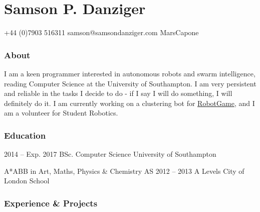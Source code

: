 \documentclass{tccv}
\begin{document}
\part{Samson P. Danziger}

    {+44 (0)7903 516311}
    {samson@samsondanziger.com}
    {MarsCapone}
    
\section{About}
I am a keen programmer interested in autonomous robots and swarm intelligence, reading Computer Science at the University of Southampton. I am very persistent and reliable in the tasks I decide to do - if I say I will do something, I will definitely do it. I am currently working on a clustering bot for \href{https://robotgame.net}{RobotGame}, and I am a volunteer for Student Robotics.

\section{Education}

\begin{yearlist}

\item{2014 -- Exp. 2017}
     {BSc. Computer Science}
     {University of Southampton}

\item[A*ABB in Art, Maths, Physics \& Chemistry AS]{2012 -- 2013}
     {A Levels}
     {City of London School}


\end{yearlist}

\section{Experience \& Projects}
\end{document}
